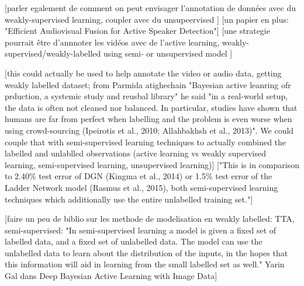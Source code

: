 [parler egalement de comment on peut envisager l'annotation de données avec du weakly-supervised learning, coupler avec du unsupeervised ]
[un papier en plus: "Efficient Audiovisual Fusion for Active Speaker Detection"]
[une strategie pourrait être d'annnoter les vidéos avec de l'active learning, weakly-supervised/weakly-labelled using semi- or unsupervised model ]

[this could actually be used to help annotate the video or audio data, getting weakly labelled dataset; from Parmida atighechain "Bayesian active leanring ofr prduction, a systemic study and reusbal library" he said "in a real-world setup, the data is often not cleaned nor balanced. In particular, studies have shown that humans are far from perfect when labelling and the problem is even worse when using crowd-sourcing (Ipeirotis et al., 2010; Allahbakhsh et al., 2013)". We could couple that with semi-supervised learning techniques to actually combined the labelled and unlablled observations (active learning vs weakly supervised learning, semi-supervised learning, unsupervised learning)]
["This is in comparison to 2.40\% test error of DGN (Kingma et al., 2014) or 1.5\% test error of the Ladder Network model (Rasmus et al., 2015), both semi-supervised learning techniques which additionally use the entire unlabelled training set."]

[faire un peu de biblio sur les methode de modelisation en weakly labelled: TTA, semi-supervised: "In semi-supervised learning a model is given a fixed set of labelled data, and a fixed set of unlabelled data. The model can use the unlabelled data to learn about the distribution of the inputs, in the hopes that this information will aid in learning from the small labelled set as well." Yarin Gal dans Deep Bayesian Active Learning with Image Data]


